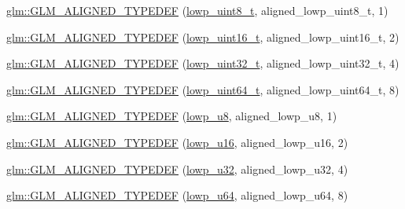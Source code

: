 \begin{DoxyCompactItemize}
\mbox{\hyperlink{group__gtx__type__aligned_ga0ba26b4e3fd9ecbc25358efd68d8a4ca}{glm\+::\+G\+L\+M\+\_\+\+A\+L\+I\+G\+N\+E\+D\+\_\+\+T\+Y\+P\+E\+D\+EF}} (\mbox{\hyperlink{group__gtc__type__precision_ga0910ef24195d1b8b26e34d73148c0c45}{lowp\+\_\+uint8\+\_\+t}}, aligned\+\_\+lowp\+\_\+uint8\+\_\+t, 1)
\item 
\mbox{\hyperlink{group__gtx__type__aligned_gaf2b58f5fb6d4ec8ce7b76221d3af43e1}{glm\+::\+G\+L\+M\+\_\+\+A\+L\+I\+G\+N\+E\+D\+\_\+\+T\+Y\+P\+E\+D\+EF}} (\mbox{\hyperlink{group__gtc__type__precision_ga9a71176a4e5bc61951f9e9197d9c80e1}{lowp\+\_\+uint16\+\_\+t}}, aligned\+\_\+lowp\+\_\+uint16\+\_\+t, 2)
\item 
\mbox{\hyperlink{group__gtx__type__aligned_gadc246401847dcba155f0699425e49dcd}{glm\+::\+G\+L\+M\+\_\+\+A\+L\+I\+G\+N\+E\+D\+\_\+\+T\+Y\+P\+E\+D\+EF}} (\mbox{\hyperlink{group__gtc__type__precision_ga9f8cb602a358e1f48bda2682cf051f0c}{lowp\+\_\+uint32\+\_\+t}}, aligned\+\_\+lowp\+\_\+uint32\+\_\+t, 4)
\item 
\mbox{\hyperlink{group__gtx__type__aligned_gaace64bddf51a9def01498da9a94fb01c}{glm\+::\+G\+L\+M\+\_\+\+A\+L\+I\+G\+N\+E\+D\+\_\+\+T\+Y\+P\+E\+D\+EF}} (\mbox{\hyperlink{group__gtc__type__precision_gabf3069d4f188557a87b1d7f35eb0a270}{lowp\+\_\+uint64\+\_\+t}}, aligned\+\_\+lowp\+\_\+uint64\+\_\+t, 8)
\item 
\mbox{\hyperlink{group__gtx__type__aligned_gad7bb97c29d664bd86ffb1bed4abc5534}{glm\+::\+G\+L\+M\+\_\+\+A\+L\+I\+G\+N\+E\+D\+\_\+\+T\+Y\+P\+E\+D\+EF}} (\mbox{\hyperlink{group__gtc__type__precision_gae63f942c49a30dbf266b2f13f3efe257}{lowp\+\_\+u8}}, aligned\+\_\+lowp\+\_\+u8, 1)
\item 
\mbox{\hyperlink{group__gtx__type__aligned_ga404bba7785130e0b1384d695a9450b28}{glm\+::\+G\+L\+M\+\_\+\+A\+L\+I\+G\+N\+E\+D\+\_\+\+T\+Y\+P\+E\+D\+EF}} (\mbox{\hyperlink{group__gtc__type__precision_ga22c5364f27caa0a6eb0627cbc21e46be}{lowp\+\_\+u16}}, aligned\+\_\+lowp\+\_\+u16, 2)
\item 
\mbox{\hyperlink{group__gtx__type__aligned_ga31ba41fd896257536958ec6080203d2a}{glm\+::\+G\+L\+M\+\_\+\+A\+L\+I\+G\+N\+E\+D\+\_\+\+T\+Y\+P\+E\+D\+EF}} (\mbox{\hyperlink{group__gtc__type__precision_gaba06fae1dd98ca50c017e68345df0365}{lowp\+\_\+u32}}, aligned\+\_\+lowp\+\_\+u32, 4)
\item 
\mbox{\hyperlink{group__gtx__type__aligned_gacca5f13627f57b3505676e40a6e43e5e}{glm\+::\+G\+L\+M\+\_\+\+A\+L\+I\+G\+N\+E\+D\+\_\+\+T\+Y\+P\+E\+D\+EF}} (\mbox{\hyperlink{group__gtc__type__precision_ga61ed4c68a4cffb77cd63cc107119123a}{lowp\+\_\+u64}}, aligned\+\_\+lowp\+\_\+u64, 8)

\end{DoxyCompactItemize}
